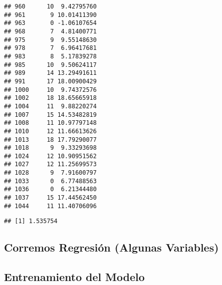 \documentclass[
]{article}
\newenvironment{Shaded}{\begin{snugshade}}{\end{snugshade}}
\newcommand{\DecValTok}[1]{\textcolor[rgb]{0.00,0.00,0.81}{#1}}
\newcommand{\KeywordTok}[1]{\textcolor[rgb]{0.13,0.29,0.53}{\textbf{#1}}}
\newcommand{\NormalTok}[1]{#1}
\newcommand{\OperatorTok}[1]{\textcolor[rgb]{0.81,0.36,0.00}{\textbf{#1}}}
\newcommand{\StringTok}[1]{\textcolor[rgb]{0.31,0.60,0.02}{#1}}
\begin{document}
\begin{verbatim}
## 960      10  9.42795760
## 961       9 10.01411390
## 963       0 -1.06107654
## 968       7  4.81400771
## 975       9  9.55148630
## 978       7  6.96417681
## 983       8  5.17839278
## 985      10  9.50624117
## 989      14 13.29491611
## 991      17 18.00900429
## 1000     10  9.74372576
## 1002     18 18.65665918
## 1004     11  9.88220274
## 1007     15 14.53482819
## 1008     11 10.97797148
## 1010     12 11.66613626
## 1013     18 17.79290077
## 1018      9  9.33293698
## 1024     12 10.90951562
## 1027     12 11.25699573
## 1028      9  7.91600797
## 1033      0  6.77488563
## 1036      0  6.21344480
## 1037     15 17.44562450
## 1044     11 11.40706096
\end{verbatim}

\begin{Shaded}
\end{Shaded}

\begin{verbatim}
## [1] 1.535754
\end{verbatim}

\hypertarget{corremos-regresiuxf3n-algunas-variables}{%
\subsection{Corremos Regresión (Algunas
Variables)}\label{corremos-regresiuxf3n-algunas-variables}}

\hypertarget{entrenamiento-del-modelo-1}{%
\subsection{Entrenamiento del Modelo}\label{entrenamiento-del-modelo-1}}
\end{document}
